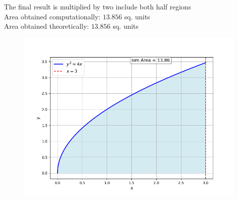 \documentclass[journal]{IEEEtran}
\begin{document}
The final result is multiplied by two include both half regions \\
Area obtained computationally: $13.856$ sq. units\\
Area obtained theoretically: $13.856$ sq. units
\begin{figure}[ht!]
   \centering
   \includegraphics[width=\columnwidth]{figs/Figure_1.png}
\end{figure}
\end{document}
